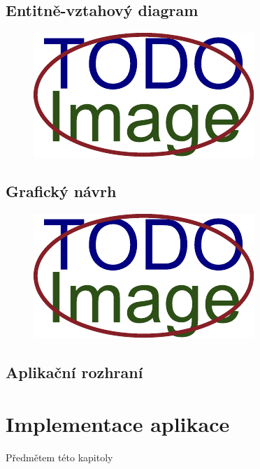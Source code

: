 \section{Entitně-vztahový diagram}
\blindtext
\begin{figure}[H]
	\centering
	\includegraphics[width=\textwidth]{obrazky-figures/placeholder.pdf}
\end{figure}

\section{Grafický návrh}
\blindtext
\begin{figure}[H]
	\centering
	\includegraphics[width=\textwidth]{obrazky-figures/placeholder.pdf}
\end{figure}


\section{Aplikační rozhraní}
\blindtext[2]

\chapter{Implementace aplikace}
Předmětem této kapitoly\blindtext

